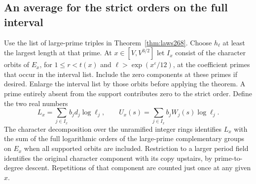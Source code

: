 \documentclass[a4paper,11pt]{article}
\theoremstyle{definition}
\theoremstyle{remark}
\numberwithin{equation}{section}
\begin{document}
\subsection{An average for the strict orders on the full interval}\label{nav:IV-41}
Use the list of large-prime triples in Theorem~\ref{thm:laws268}.
Choose \(h_\ell\) at least the largest length at that prime.
At \(x\in[V,V^{3/2}]\) let \(I_x\) consist of the character
orbits of \(E_x\), for \(1\le r<t(x)\) and
\(\ell>\exp(x^\varepsilon/12)\), at the coefficient primes
that occur in the interval list. Include the zero components
at these primes if desired. Enlarge the interval list by those
orbits before applying the theorem. A prime entirely absent
from the support contributes zero to the strict order.
Define the two real numbers
\[
 L_x=\sum_{j\in I_x}b_jd_j\log\ell_j,\qquad
 U_x(s)=\sum_{j\in I_x}b_jW_j(s)\log\ell_j .
\]
The character decomposition over the unramified integer rings
identifies \(L_x\) with the sum of the full logarithmic orders
of the large-prime complementary groups on \(E_x\) when all
supported orbits are included. Restriction to a larger period
field identifies the original character component with its
copy upstairs, by prime-to-degree descent. Repetitions of that
component are counted just once at any given \(x\).
\end{document}
